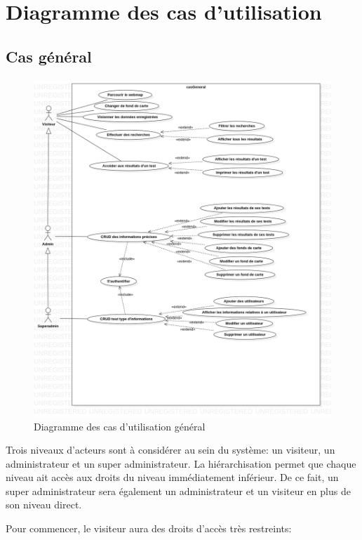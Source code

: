\section{Diagramme des cas d'utilisation}
    \subsection{Cas général}
    \paragraph{}
    \begin{figure}
        \centering
        \includegraphics[width=1\textwidth]{casGeneral.png}
        \caption{Diagramme des cas d'utilisation général}
    \end{figure}
    Trois niveaux d'acteurs sont à considérer au sein du système: un visiteur, 
    un administrateur et un super administrateur. La hiérarchisation permet que 
    chaque niveau ait accès aux droits du niveau immédiatement inférieur. 
    De ce fait, un super administrateur sera également un administrateur et 
    un visiteur en plus de son niveau direct. \par 
Pour commencer, le visiteur aura des droits d'accès très restreints: \par 
